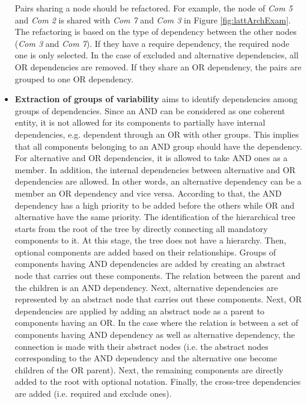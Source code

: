 \documentclass[graybox]{svmult}
\begin{document}
\begin{itemize}
Pairs sharing a node should be refactored. For example, the node of \textit{Com 5} and \textit{Com 2} is shared with \textit{Com 7} and \textit{Com 3} in Figure \ref{fig:lattArchExam}. 
The refactoring is based on the type of dependency between the other nodes (\textit{Com 3} and \textit{Com 7}). If they have a require dependency, the required node one is only selected. In the case of excluded and alternative dependencies, all OR dependencies are removed. If they share an OR dependency, the pairs are grouped to one OR dependency.

\item \textbf{Extraction of groups of variability} aims to identify dependencies among groups of dependencies. Since an AND can be considered as one coherent entity, it is not allowed for its components to partially have internal dependencies, e.g. dependent through an OR with other groups. This implies that all components belonging to an AND group should have the dependency.
For alternative and OR dependencies, it is allowed to take AND ones as a member. In addition, the internal dependencies between alternative and OR dependencies are allowed. In other words, an alternative dependency can be a member an OR dependency and vice versa. 
According to that, the AND dependency has a high priority to be added before the others while OR and alternative have the same priority.
The identification of the hierarchical tree starts from the root of the tree by directly connecting all mandatory components to it. At this stage, the tree does not have a hierarchy. Then, optional components are added based on their relationships. Groups of components having AND dependencies are added by creating an abstract node that carries out these components. The relation between the parent and the children is an AND dependency. Next, alternative dependencies are represented by an abstract node that carries out these components. Next, OR dependencies are applied by adding an abstract node as a parent to components having an OR. In the case where the relation is between a set of components having AND dependency as well as alternative dependency, the connection is made with their abstract nodes (i.e. the abstract nodes corresponding to the AND dependency and the alternative one become children of the OR parent). Next, the remaining components are directly added to the root with optional notation. Finally, the cross-tree dependencies are added (i.e. required and exclude ones). 
\end{itemize}
\end{document}

